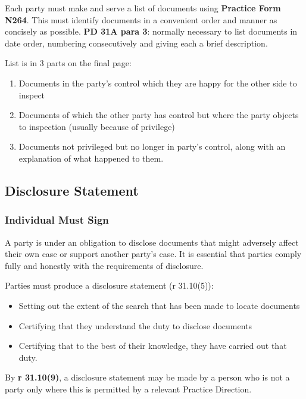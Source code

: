 \documentclass[
]{article}
\providecommand{\tightlist}{%
  \setlength{\itemsep}{0pt}\setlength{\parskip}{0pt}}
\begin{document}
Each party must make and serve a list of documents using
\textbf{Practice Form N264}. This must identify documents in a
convenient order and manner as concisely as possible. \textbf{PD 31A
para 3}: normally necessary to list documents in date order, numbering
consecutively and giving each a brief description.

List is in 3 parts on the final page:

\begin{enumerate}
\def\labelenumi{\arabic{enumi}.}
\tightlist
\item
  Documents in the party's control which they are happy for the other
  side to inspect
\item
  Documents of which the other party has control but where the party
  objects to inspection (usually because of privilege)
\item
  Documents not privileged but no longer in party's control, along with
  an explanation of what happened to them.
\end{enumerate}

\hypertarget{disclosure-statement}{%
\subsection{Disclosure Statement}\label{disclosure-statement}}

\hypertarget{individual-must-sign}{%
\subsubsection{Individual Must Sign}\label{individual-must-sign}}

A party is under an obligation to disclose documents that might
adversely affect their own case or support another party's case. It is
essential that parties comply fully and honestly with the requirements
of disclosure.

Parties must produce a disclosure statement (r 31.10(5)):

\begin{itemize}
\tightlist
\item
  Setting out the extent of the search that has been made to locate
  documents
\item
  Certifying that they understand the duty to disclose documents
\item
  Certifying that to the best of their knowledge, they have carried out
  that duty.
\end{itemize}

By \textbf{r 31.10(9)}, a disclosure statement may be made by a person
who is not a party only where this is permitted by a relevant Practice
Direction.
\end{document}

